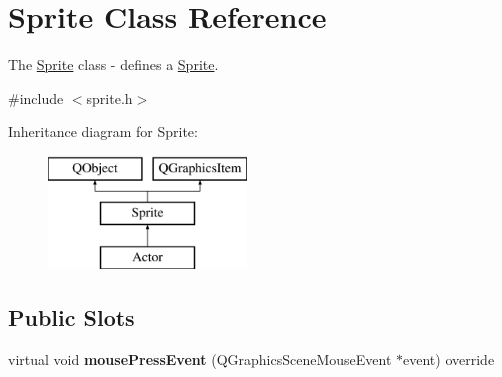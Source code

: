\hypertarget{class_sprite}{}\section{Sprite Class Reference}
\label{class_sprite}


The \hyperlink{class_sprite}{Sprite} class -\/ defines a \hyperlink{class_sprite}{Sprite}.  




{\ttfamily \#include $<$sprite.\+h$>$}

Inheritance diagram for Sprite\+:\begin{figure}[H]
\begin{center}
\leavevmode
\includegraphics[height=3.000000cm]{class_sprite}
\end{center}
\end{figure}
\subsection*{Public Slots}
\begin{DoxyCompactItemize}
\item 
\mbox{\label{class_sprite_ab76c12803dcd1f7a44c4acbbec91380d}} 
virtual void {\bfseries mouse\+Press\+Event} (Q\+Graphics\+Scene\+Mouse\+Event $\ast$event) override
\end{DoxyCompactItemize}
